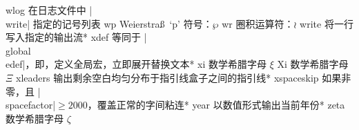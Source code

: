 \capcs wlog {在日志文件中 |\\write| 指定的记号列表}{}{}
\capcs wp {Weierstra\ss\ `p' 符号：$\wp$}{}{}
\capcs wr {圈积运算符：$\wr$}{}{}
\capcs write {将一行写入指定的输出流}*{}
\capcs xdef {等同于 |\\global\\edef|，即，定义全局宏，立即展开替换文本}*{}
\capcs xi {数学希腊字母 $\xi$}{}{}
\capcs Xi {数学希腊字母 $\Xi$}{}{}
\capcs xleaders {输出剩余空白均匀分布于指引线盒子之间的指引线}*{}
\capcs xspaceskip {如果非零，且 |\\spacefactor|${}\ge2000$，覆盖正常的字间粘连}*{}
\capcs year {以数值形式输出当前年份}*{}
\capcs zeta {数学希腊字母 $\zeta$}{}{}

\endcapsum
\endchapter
\byebye
